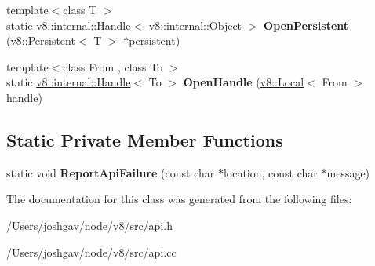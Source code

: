 \begin{DoxyCompactItemize}
\item 
{\footnotesize template$<$class T $>$ }\\static \hyperlink{classv8_1_1internal_1_1_handle}{v8\+::internal\+::\+Handle}$<$ \hyperlink{classv8_1_1internal_1_1_object}{v8\+::internal\+::\+Object} $>$ {\bfseries Open\+Persistent} (\hyperlink{classv8_1_1_persistent}{v8\+::\+Persistent}$<$ T $>$ $\ast$persistent)\hypertarget{classv8_1_1_utils_a0638ee97beb33d821220b91f47cff4dd}{}\label{classv8_1_1_utils_a0638ee97beb33d821220b91f47cff4dd}

\item 
{\footnotesize template$<$class From , class To $>$ }\\static \hyperlink{classv8_1_1internal_1_1_handle}{v8\+::internal\+::\+Handle}$<$ To $>$ {\bfseries Open\+Handle} (\hyperlink{classv8_1_1_local}{v8\+::\+Local}$<$ From $>$ handle)\hypertarget{classv8_1_1_utils_a607b2ed012097b00edf6d9cc41ce30b3}{}\label{classv8_1_1_utils_a607b2ed012097b00edf6d9cc41ce30b3}

\end{DoxyCompactItemize}
\subsection*{Static Private Member Functions}
\begin{DoxyCompactItemize}
\item 
static void {\bfseries Report\+Api\+Failure} (const char $\ast$location, const char $\ast$message)\hypertarget{classv8_1_1_utils_ada484ca14c019e18695f4a98dbe33796}{}\label{classv8_1_1_utils_ada484ca14c019e18695f4a98dbe33796}

\end{DoxyCompactItemize}


The documentation for this class was generated from the following files\+:\begin{DoxyCompactItemize}
\item 
/\+Users/joshgav/node/v8/src/api.\+h\item 
/\+Users/joshgav/node/v8/src/api.\+cc\end{DoxyCompactItemize}

